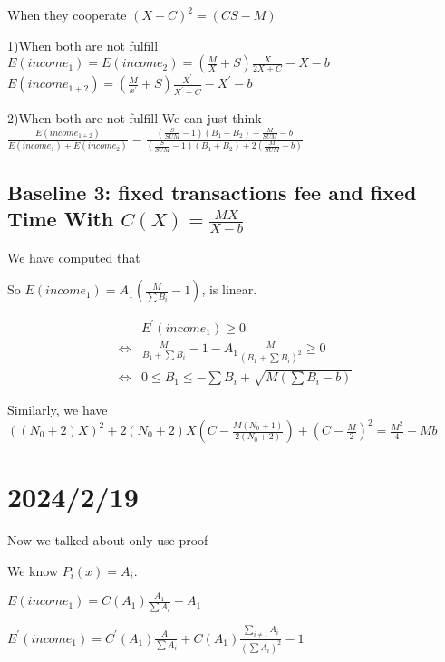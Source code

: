 \documentclass{article}
\begin{document}
 When they cooperate
  $(X+C)^2=(CS-M)$
\par1)When both are not fulfill
$E(income_1)=E(income_2)=(\frac{M}{X}+S)\frac{X}{2X+C}-X-b$
$E(income_{1+2})=(\frac{M}{x^{'}}+S)\frac{X^{'}}{X^{'}+C}-X^{'}-b$
\par2)When both are not fulfill
We can just think $\frac{E(income_{1+2})}{E(income_1)+E(income_2)}=\frac{(\frac{S}{SUM}-1)(B_1+B_2)+\frac{M}{SUM}-b}{(\frac{S}{SUM}-1)(B_1+B_2)+2(\frac{M}{SUM}-b)}$
\subsection{Baseline 3: fixed transactions fee and fixed Time With $C(X)=\frac{MX}{X-b}$}
We have computed that
\par So $E(income_1)=A_1(\frac{M}{\sum B_i}-1)$, is linear.
 \par
 \begin{equation}
\begin{aligned}
&E^{'}(income_1)\ge 0
\\\Longleftrightarrow&\frac{M}{B_1+\sum B_i}-1-A_1\frac{M}{(B_1+\sum B_i)^2}\ge 0
\\\Longleftrightarrow& 0 \le B_1 \le -\sum B_i+\sqrt{M(\sum B_i-b)}
\end{aligned}
\end{equation}
\par Similarly, we have $((N_0+2)X)^2+2(N_0+2)X(C-\frac{M(N_0+1)}{2(N_0+2)})+(C-\frac{M}{2})^2=\frac{M^2}{4}-Mb$



\section{2024/2/19}
Now we talked about only use proof
\par We know $P_i(x)=A_i$.
\par $E(income_1)=C(A_1)\frac{A_1}{\sum A_i}-A_1$
\par $E^{'}(income_1)=C^{'}(A_1)\frac{A_1}{\sum A_i}+C(A_1)\frac{\sum_{i\ne1}A_i}{(\sum A_i)^2}-1$
\end{document}
